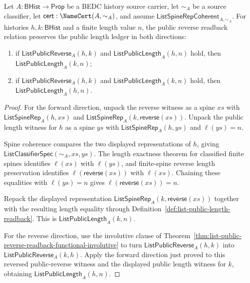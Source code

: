 \begin{theorem}
\label{thm:list-public-reverse-length-preservation}
Let $A:\mathsf{BHist}\to\mathsf{Prop}$ be a BEDC history source carrier, let
$\sim_A$ be a source classifier, let $\mathsf{cert}:\NameCert(A,\sim_A)$, and
assume $\mathsf{ListSpineRepCoherent}_{A,\sim_A}$. For histories
$h,k:\mathsf{BHist}$ and a finite length value $n$, the public reverse readback
relation preserves the public length ledger in both directions:
\begin{enumerate}
  \item if $\mathsf{ListPublicReverse}_A(h,k)$ and
  $\mathsf{ListPublicLength}_A(h,n)$ hold, then
  $\mathsf{ListPublicLength}_A(k,n)$;
  \item if $\mathsf{ListPublicReverse}_A(h,k)$ and
  $\mathsf{ListPublicLength}_A(k,n)$ hold, then
  $\mathsf{ListPublicLength}_A(h,n)$.
\end{enumerate}
\end{theorem}
\begin{proof}
For the forward direction, unpack the reverse witness as a spine $xs$ with
$\mathsf{ListSpineRep}_A(h,xs)$ and
$\mathsf{ListSpineRep}_A(k,\mathsf{reverse}(xs))$. Unpack the public length
witness for $h$ as a spine $ys$ with $\mathsf{ListSpineRep}_A(h,ys)$ and
$\ell(ys)=n$.

Spine coherence compares the two displayed representations of $h$, giving
$\mathsf{ListClassifierSpec}(\sim_A,xs,ys)$. The length exactness theorem for
classified finite spines identifies $\ell(xs)$ with $\ell(ys)$, and finite-spine
reverse length preservation identifies $\ell(\mathsf{reverse}(xs))$ with
$\ell(xs)$. Chaining these equalities with $\ell(ys)=n$ gives
$\ell(\mathsf{reverse}(xs))=n$.

Repack the displayed representation
$\mathsf{ListSpineRep}_A(k,\mathsf{reverse}(xs))$ together with the resulting
length equality through Definition~\ref{def:list-public-length-readback}. This
is $\mathsf{ListPublicLength}_A(k,n)$.

For the reverse direction, use the involutive clause of
Theorem~\ref{thm:list-public-reverse-readback-functional-involutive} to turn
$\mathsf{ListPublicReverse}_A(h,k)$ into $\mathsf{ListPublicReverse}_A(k,h)$.
Apply the forward direction just proved to this reversed public-reverse witness
and the displayed public length witness for $k$, obtaining
$\mathsf{ListPublicLength}_A(h,n)$.
\end{proof}

